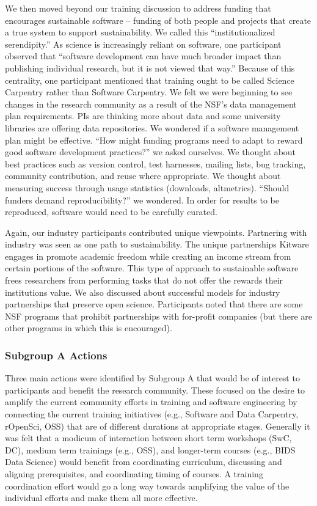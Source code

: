 \documentclass[11pt, oneside]{amsart}
\begin{document}
We then moved beyond our training discussion to address funding that encourages
sustainable software -- funding of both people and projects that create a true
system to support sustainability. We called this ``institutionalized
serendipity.'' As science is increasingly reliant on software, one participant
observed that ``software development can have much broader impact than
publishing individual research, but it is not viewed that way.'' Because of this
centrality, one participant mentioned that training ought to be called Science
Carpentry rather than Software Carpentry. We felt we were beginning to see
changes in the research community as a result of the NSF's data management plan
requirements. PIs are thinking more about data and some university libraries are
offering data repositories. We wondered if a software management plan might be
effective. ``How might funding programs need to adapt to reward good software
development practices?'' we asked ourselves. We thought about best practices
such as version control, test harnesses, mailing lists, bug tracking, community
contribution, and reuse where appropriate. We thought about measuring success
through usage statistics (downloads, altmetrics). ``Should funders demand
reproducibility?'' we wondered. In order for results to be reproduced, software
would need to be carefully curated.

Again, our industry participants contributed unique viewpoints. Partnering with
industry was seen as one path to sustainability. The unique partnerships Kitware
engages in promote academic freedom while creating an income stream from certain
portions of the software. This type of approach to sustainable software frees
researchers from performing tasks that do not offer the rewards their
institutions value. We also discussed about successful models for industry
partnerships that preserve open science. Participants noted that there are some
NSF programs that prohibit partnerships with for-profit companies (but there are
other programs in which this is encouraged).


\subsubsection{Subgroup A Actions}

Three main actions were identified by Subgroup A that would be of interest to
participants and benefit the research community. These focused on the
desire to amplify the current community efforts in training and software
engineering by connecting the current training initiatives (e.g., Software and Data Carpentry,
rOpenSci, OSS) that are of different durations at appropriate stages.
Generally it was felt that a modicum of interaction between short term workshops
(SwC, DC), medium term trainings (e.g., OSS), and longer-term courses (e.g.,
BIDS Data Science) would benefit from coordinating curriculum, discussing and
aligning prerequisites, and coordinating timing of courses. A training
coordination effort would go a long way towards amplifying the value of the
individual efforts and make them all more effective.
\end{document}
